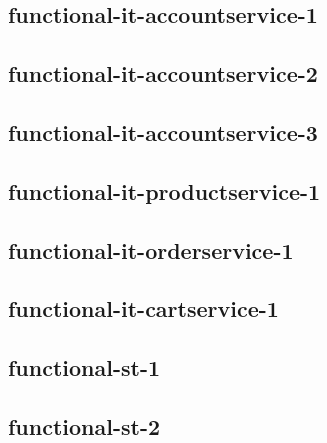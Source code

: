 \subsection{functional-it-accountservice-1}
\begingroup
\obeylines
%
\endgroup%

\subsection{functional-it-accountservice-2}
\begingroup
\obeylines
%
\endgroup%

\subsection{functional-it-accountservice-3}
\begingroup
\obeylines
%
\endgroup%

\subsection{functional-it-productservice-1}
\begingroup
\obeylines
%
\endgroup%

\subsection{functional-it-orderservice-1}
\begingroup
\obeylines
%
\endgroup%

\subsection{functional-it-cartservice-1}
\begingroup
\obeylines
%
\endgroup%

\subsection{functional-st-1}
\begingroup
\obeylines
%
\endgroup%

\subsection{functional-st-2}
\begingroup
\obeylines
%
\endgroup%

